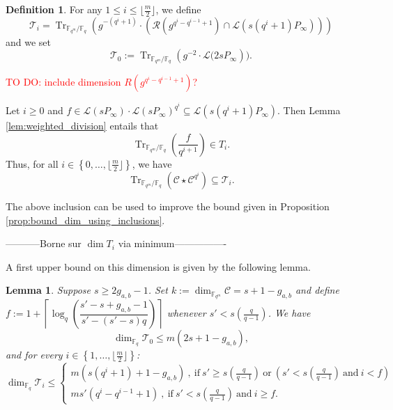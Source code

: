 \documentclass[a4paper]{article}
\newtheorem{lemma}[thm]{Lemma}
\theoremstyle{definition}
\newtheorem{definition}[thm]{Definition}
\theoremstyle{remark}
\newcommand{\calL}{\mathcal{L}}
\newcommand{\calC}{\mathcal{C}}
\newcommand{\calR}{\mathcal{R}}
\newcommand{\calT}{\mathcal{T}}
\newcommand{\fqm}{\mathbb{F}_{q^m}}
\newcommand{\fq}{\mathbb{F}_{q}}
\newcommand{\Tr}[1]{\operatorname{Tr}_{\mathbb{F}_{q^m}/\fq}\left(#1\right)}
\newcommand{\set}[1]{\left\{#1\right\}}
\newcommand\TODO[1]{\textcolor{red}{TO DO: #1}}
\begin{document}
\begin{definition} \label{def:T_i's}
For any $1 \leq i \leq \lfloor\frac{m}{2}\rfloor$, we define
$$\calT_i= \Tr{g^{-(q^i+1)}\cdot \left( \calR\left(g^{q^i-q^{i-1}+1}\right)  \cap \calL(s(q^i+1)P_\infty)\right)}$$
and we set $$\calT_0 := \Tr{g^{-2} \cdot \calL(2sP_\infty}).$$
\end{definition}
	
\TODO{include dimension $R(g^{q^i-q^{i-1}+1})$?}	
	
	
\noindent Let $i \geq 0$ and $f \in \calL(sP_\infty) \cdot \calL(sP_\infty)^{q^i} \subseteq \calL(s(q^i+1)P_\infty)$. Then 
Lemma \ref{lem:weighted_division} entails that 
$$\Tr{\dfrac{f}{q^{i+1}}} \in T_i.$$
Thus, for all $i \in \set{0,\dots,\lfloor \frac{m}{2} \rfloor}$, we have \begin{equation} \label{eq:Tr(C*C^q^i)_dans_T_i}
\Tr{\calC \star \calC^{q^i}} \subseteq \calT_i.
\end{equation}

\noindent The above inclusion can be used to improve the bound given in Proposition \ref{prop:bound_dim_using_inclusions}.

\begin{center}\color{red} -----------Borne sur $\dim T_i$ via minimum----------------
\color{black}\end{center}


A first upper bound on this dimension is given by the following lemma.

\begin{lemma} \label{lem:estimation_dim_T_i} Suppose $s \geq 2g_{a,b}-1$. Set $k := \dim_{\fqm}\calC = s+1-g_{a,b}$ and define $f := 1 + \left\lceil \log_q \left( \dfrac{s'-s+g_{a,b}-1}{s'-(s'-s)q}\right)\right\rceil$ whenever $s' < s(\frac{q}{q-1})$.
We have $$\dim_{\fq} \calT_0 \leq m(2s+1-g_{a,b}),$$ and for every $i \in \set{1,\dots,\lfloor \frac{m}{2} \rfloor}$:
\begin{equation*}
\dim_{\fq} \calT_i \leq \left\{ \begin{array}{ll}
     m(s(q^i+1)+1-g_{a,b}) \ , \ \mathrm{if} \ s' \geq s(\frac{q}{q-1}) \ \mathrm{or} \ (s' < s(\frac{q}{q-1}) \ \mathrm{and} \ i<f)  \\
     ms'(q^i-q^{i-1}+1) \ , \ \mathrm{if} \ s' < s(\frac{q}{q-1}) \ \mathrm{and} \ i \geq f. 
\end{array}
\right.
\end{equation*}
\end{lemma}
\end{document}
